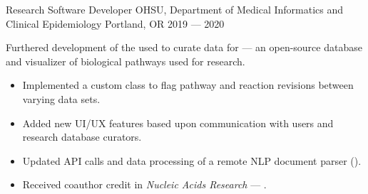 \showoff
{Research Software Developer}
{OHSU, Department of Medical Informatics and Clinical Epidemiology}
{Portland, OR}
{2019 --- 2020}

Furthered development of the  used to curate data for  --- an open-source database and visualizer of biological pathways used for research.

\begin{itemize}[label=$\triangleright$]
    \item Implemented a custom class to flag pathway and reaction revisions between varying data sets.
    \item Added new UI/UX features based upon communication with users and research database curators.
    \item Updated API calls and data processing of a remote NLP document parser ().
    \item Received coauthor credit in \emph{Nucleic Acids Research} --- .
\end{itemize}

